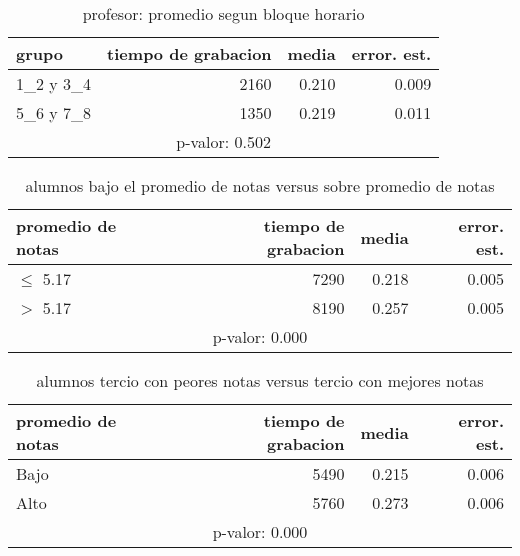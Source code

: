 \documentclass[spanish]{article}
\begin{document}
\begin{table}[h!]
\begin{center}
\begin{tabular}{|l|r|r|r|}
\hline
grupo     & tiempo de grabacion & media          & error. est.     \\ \hline
1\_2 y 3\_4 &                2160 &          0.210 &            0.009\\ \hline
5\_6 y 7\_8 &                1350 &          0.219 &            0.011\\ \hline
\multicolumn{4}{|c|}{p-valor: 0.502} \\ \hline
\end{tabular}
\caption{profesor: promedio segun bloque horario}
\end{center}
\end{table}

\begin{table}[h!]
\begin{center}
\begin{tabular}{|l|r|r|r|}
\hline
promedio de notas & tiempo de grabacion & media          & error. est.     \\ \hline
$\leq$ 5.17           &                7290 &          0.218 &            0.005\\ \hline
$>$ 5.17            &                8190 &          0.257 &            0.005\\ \hline
\multicolumn{4}{|c|}{p-valor: 0.000} \\ \hline
\end{tabular}
\caption{alumnos bajo el promedio de notas versus sobre promedio de notas}
\end{center}
\end{table}

\begin{table}[h!]
\begin{center}
\begin{tabular}{|l|r|r|r|}
\hline
promedio de notas & tiempo de grabacion & media          & error. est.     \\ \hline
Bajo              &                5490 &          0.215 &            0.006\\ \hline
Alto              &                5760 &          0.273 &            0.006\\ \hline
\multicolumn{4}{|c|}{p-valor: 0.000} \\ \hline
\end{tabular}
\caption{alumnos tercio con peores notas versus tercio con mejores notas}
\end{center}
\end{table}
\end{document}
